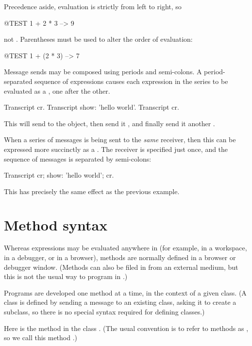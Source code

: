 \documentclass[a4paper,10pt,twoside]{book}
\begin{document}
Precedence aside, evaluation is strictly from left to right, so
\begin{code}{@TEST}
1 + 2 * 3 --> 9
\end{code}
not .
Parentheses must be used to alter the order of evaluation:
\begin{code}{@TEST}
1 + (2 * 3) --> 7
\end{code}

Message sends may be composed using periods and semi-colons.
A period-separated sequence of expressions causes each expression in the series to be evaluated as a , one after the other.

\begin{code}{}
Transcript cr.
Transcript show: 'hello world'.
Transcript cr.
\end{code}

\noindent
This will send  to the  object, then send it , and finally send it another .

When a series of messages is being sent to the \emph{same} receiver, then this can be expressed more succinctly as a .
The receiver is specified just once, and the sequence of messages is separated by semi-colons:

\begin{code}{}
Transcript 
	cr;
    show: 'hello world';
    cr.
\end{code}
This has precisely the same effect as the previous example.

\section{Method syntax}

Whereas expressions may be evaluated anywhere in \sq (for example, in a workspace, in a debugger, or in a browser), methods are normally defined in a browser or debugger window.
(Methods can also be filed in from an external medium, but this is not the usual way to program in \sq.)

Programs are developed one method at a time, in the context of a given class.
(A class is defined by sending a message to an existing class, asking it to create a subclass, so there is no special syntax required for defining classes.)

Here is the method  in the class .
(The usual convention is to refer to methods as , so we call this method .)
\end{document}
